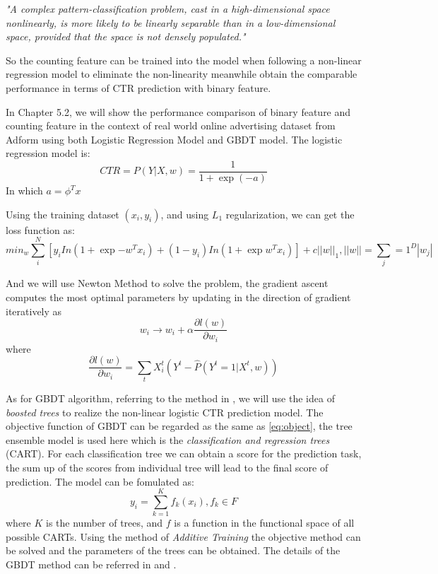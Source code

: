 \textit{"A complex pattern-classification problem, cast in a high-dimensional space nonlinearly, is more likely to be linearly separable than in a low-dimensional space, provided that the space is not densely populated."}

So the counting feature can be trained into the model when following a non-linear regression model to eliminate the non-linearity meanwhile obtain the comparable performance in terms of CTR prediction with binary feature.

In Chapter 5.2, we will show the performance comparison of binary feature and counting feature in the context of real world online advertising dataset from Adform using both Logistic Regression Model and GBDT model. 
The logistic regression model is:
\begin{equation}
CTR = P(Y|X,w) = \frac{1}{1 + \exp(-a)}  
\end{equation}
In which \(a = \phi^T x\)

Using the training dataset \((x_i,y_i)\), and using \(L_\text{1}\) regularization, we can get the loss function as:
\begin{equation}  \label{eq:object}
min_w \sum_{i}^{N} [y_i In(1+\exp {-w^T x_i}) + (1-y_i) In(1+\exp {w^T x_i})] + c||w||_1, ||w|| = \sum_j=1^D |w_j|
\end{equation}

And we will use Newton Method to solve the problem, the gradient ascent computes the most optimal parameters by updating in the direction of gradient iteratively as 
\begin{equation}
w_{i} \rightarrow w_{i} + \alpha \frac{\partial l(w)}{\partial w_{i}}  
\end{equation}
where 
\begin{equation}
\frac{\partial l(w)}{\partial w_{i}} = \sum_{t} X^{t}_{i}(Y^{t} - \hat{P}(Y^{t} = 1|X^{t}, w))  
\end{equation}

As for GBDT algorithm, referring to the method in \cite{boostedtree}, we will use the idea of \textit{boosted trees} to realize the non-linear logistic CTR prediction model. The objective function of GBDT can be regarded as the same as \ref{eq:object}, the tree ensemble model is used here which is the \textit{classification and regression trees} (CART). For each classification tree we can obtain a score for the prediction task, the sum up of the scores from individual tree will lead to the final score of prediction. The model can be fomulated as:
\begin{equation}
y_i = \sum_{k=1}^K f_k(x_i), f_k \in F
\end{equation}
where \(K\) is the number of trees, and \(f\) is a function in the functional space of all possible CARTs. Using the method of \textit{Additive Training} the objective method can be solved and the parameters of the trees can be obtained. The details of the GBDT method can be referred in \cite{boostedtree} and \cite{he2014practical}.

